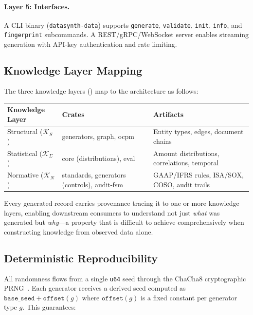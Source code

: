 \paragraph{Layer 5: Interfaces.}
A CLI binary (\texttt{datasynth-data}) supports \texttt{generate},
\texttt{validate}, \texttt{init}, \texttt{info}, and \texttt{fingerprint}
subcommands.  A REST/gRPC/WebSocket server enables streaming
generation with API-key authentication and rate limiting.

\subsection{Knowledge Layer Mapping}
\label{sec:arch_knowledge_mapping}

The three knowledge layers () map to the
architecture as follows:

\begin{center}
\small
\begin{tabular}{@{}l p{} p{}@{}}
\toprule
\textbf{Knowledge Layer} & \textbf{Crates} & \textbf{Artifacts} \\
\midrule
Structural ($\mathcal{K}_S$) &
  generators, graph, ocpm &
  Entity types, edges, document chains \\[3pt]
Statistical ($\mathcal{K}_\Sigma$) &
  core (distributions), eval &
  Amount distributions, correlations, temporal \\[3pt]
Normative ($\mathcal{K}_N$) &
  standards, generators (controls), audit-fsm &
  GAAP/IFRS rules, ISA/SOX, COSO, audit trails \\
\bottomrule
\end{tabular}
\end{center}

Every generated record carries provenance tracing it to one or more
knowledge layers, enabling downstream consumers to understand not just
\emph{what} was generated but \emph{why}---a property that is difficult to achieve comprehensively when
constructing knowledge from observed data alone.

\subsection{Deterministic Reproducibility}
\label{sec:arch_determinism}

All randomness flows from a single \texttt{u64} seed through the ChaCha8
cryptographic PRNG~\citep{bernstein2008chacha}.  Each generator receives
a derived seed computed as $\texttt{base\_seed} + \texttt{offset}(g)$
where $\texttt{offset}(g)$ is a fixed constant per generator type $g$.
This guarantees:

